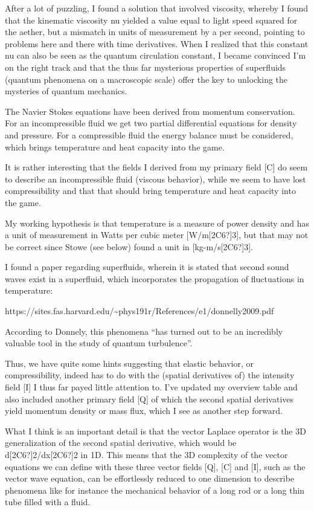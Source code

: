 \documentclass{article}
\begin{document}
After a lot of puzzling, I found a solution that involved viscosity, whereby I found that the kinematic viscosity nu
yielded a value equal to light speed squared for the aether, but a mismatch in units of measurement by a per second,
pointing to problems here and there with time derivatives. When I realized that this constant nu can also be seen as
the quantum circulation constant, I became convinced I'm on the right track and that the thus far mysterious properties
of superfluids (quantum phenomena on a macroscopic scale) offer the key to unlocking the mysteries of quantum
mechanics.

{\textquotedbl}The Navier Stokes equations have been derived from momentum conservation. For an incompressible fluid we
get two partial differential equations for density and pressure. For a compressible fluid the energy balance must be
considered, which brings temperature and heat capacity into the game.{\textquotedbl}

It is rather interesting that the fields I derived from my primary field [C] do seem to describe an incompressible fluid
(viscous behavior), while we seem to have lost compressibility and that that should bring temperature and heat capacity
into the game.

My working hypothesis is that temperature is a measure of power density and has a unit of measurement in Watts per cubic
meter [W/m[2C6?]3], but that may not be correct since Stowe (see below) found a unit in [kg-m/s[2C6?]3].  

I found a paper regarding superfluids, wherein it is stated that {\textquotedbl}second sound{\textquotedbl} waves exist
in a superfluid, which incorporates the propagation of fluctuations in temperature:

https://sites.fas.harvard.edu/\~{}phys191r/References/e1/donnelly2009.pdf 

According to Donnely, this phenomena ``has turned out to be an incredibly valuable tool in the study of quantum
turbulence''.  

Thus, we have quite some hints suggesting that elastic behavior, or compressibility, indeed has to do with the (spatial
derivatives of) the intensity field [I] I thus far payed little attention to. I've updated my overview table and also
included another primary field [Q] of which the second spatial derivatives yield momentum density or mass flux, which I
see as another step forward.

What I think is an important detail is that the vector Laplace operator is the 3D generalization of the second spatial
derivative, which would be d[2C6?]2/dx[2C6?]2 in 1D. This means that the 3D complexity of the vector equations we can
define with these three vector fields [Q], [C] and [I], such as the vector wave equation, can be effortlessly reduced
to one dimension to describe phenomena like for instance the mechanical behavior of a long rod or a long thin tube
filled with a fluid.  
\end{document}
